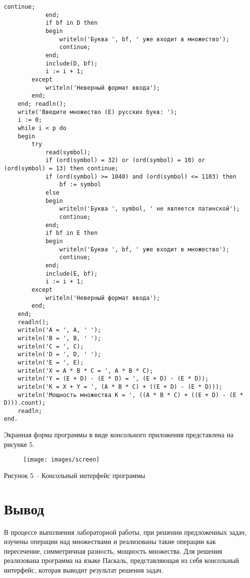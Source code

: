 \documentclass[a4paper,14pt]{extarticle}
\begin{document}
\begin{Verbatim}[tabsize=2]
				continue;
			end;
			if bf in D then
			begin
				writeln('Буква ', bf, ' уже входит в множество');
				continue;
			end;
			include(D, bf);
			i := i + 1;
		except
			writeln('Неверный формат ввода');
		end;
	end; readln();
	write('Введите множество (E) русских букв: ');
	i := 0;
	while i < p do
	begin
		try
			read(symbol);
			if (ord(symbol) = 32) or (ord(symbol) = 10) or (ord(symbol) = 13) then continue;
			if (ord(symbol) >= 1040) and (ord(symbol) <= 1103) then
				bf := symbol
			else
			begin
				writeln('Буква ', symbol, ' не является латинской');
				continue;
			end;
			if bf in E then
			begin
				writeln('Буква ', bf, ' уже входит в множество');
				continue;
			end;
			include(E, bf);
			i := i + 1;
		except
			writeln('Неверный формат ввода');
		end;
	end;
	readln();
	writeln('A = ', A, ' ');
	writeln('B = ', B, ' ');
	writeln('C = ', C);
	writeln('D = ', D, ' ');
	writeln('E = ', E);
	writeln('X = A * B * C = ', A * B * C);
	writeln('Y = (E + D) - (E * D) = ', (E + D) - (E * D));
	writeln('K = X + Y = ', (A * B * C) + ((E + D) - (E * D)));
	writeln('Мощность множества K = ', ((A * B * C) + ((E + D) - (E * D))).count);
	readln;
end.
	\end{Verbatim}
	
	Экранная форма программы в виде консольного приложения представлена на рисунке 5.
	\begin{figure}[h]
		\centering
		\texttt{[image: images/screen]}
	\end{figure}
	\begin{center}
		Рисунок 5 – Консольный интерфейс программы
	\end{center}
	
	\section*{Вывод}
	В процессе выполнения лабораторной работы, при решении предложенных задач, изучены операции над множествами и реализованы такие операции как пересечение, симметричная разность, мощность множества. Для решения реализована программа на языке Паскаль, представляющая из себя консольный интерфейс, которая выводит результат решения задач.
\end{document}
